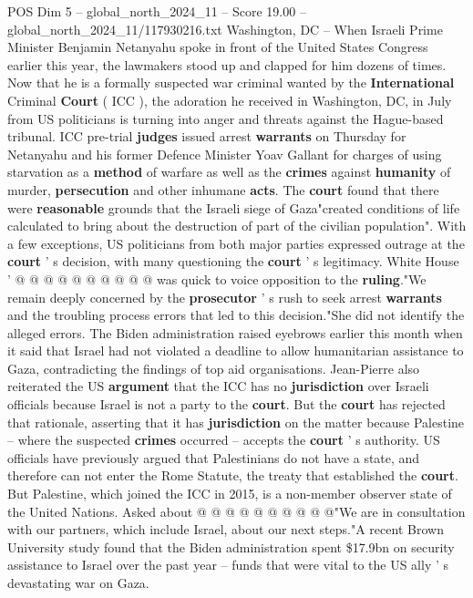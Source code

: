 \begin{textsample}{POS Dim 5 – global\_north\_2024\_11 – Score 19.00 – global\_north\_2024\_11/117930216.txt}  \label{ex:f5_pos_034}
Washington, DC -- When Israeli Prime Minister Benjamin Netanyahu spoke in front of the United States Congress earlier this year, the lawmakers stood up and clapped for him dozens of times.
Now that he is a formally suspected war criminal wanted by the \textbf{International} Criminal \textbf{Court} ( ICC ), the adoration he received in Washington, DC, in July from US politicians is turning into anger and threats against the Hague-based tribunal.
ICC pre-trial \textbf{judges} issued arrest \textbf{warrants} on Thursday for Netanyahu and his former Defence Minister Yoav Gallant for charges of using starvation as a \textbf{method} of warfare as well as the \textbf{crimes} against \textbf{humanity} of murder, \textbf{persecution} and other inhumane \textbf{acts}.
The \textbf{court} found that there were \textbf{reasonable} grounds that the Israeli siege of Gaza"created conditions of life calculated to bring about the destruction of part of the civilian population".
With a few exceptions, US politicians from both major parties expressed outrage at the \textbf{court} ' s decision, with many questioning the \textbf{court} ' s legitimacy.
White House ' @ @ @ @ @ @ @ @ @ @ was quick to voice opposition to the \textbf{ruling}."We remain deeply concerned by the \textbf{prosecutor} ' s rush to seek arrest \textbf{warrants} and the troubling process errors that led to this decision."She did not identify the alleged errors.
The Biden administration raised eyebrows earlier this month when it said that Israel had not violated a deadline to allow humanitarian assistance to Gaza, contradicting the findings of top aid organisations.
Jean-Pierre also reiterated the US \textbf{argument} that the ICC has no \textbf{jurisdiction} over Israeli officials because Israel is not a party to the \textbf{court}.
But the \textbf{court} has rejected that rationale, asserting that it has \textbf{jurisdiction} on the matter because Palestine -- where the suspected \textbf{crimes} occurred -- accepts the \textbf{court} ' s authority.
US officials have previously argued that Palestinians do not have a state, and therefore can not enter the Rome Statute, the treaty that established the \textbf{court}.
But Palestine, which joined the ICC in 2015, is a non-member observer state of the United Nations.
Asked about @ @ @ @ @ @ @ @ @ @"We are in consultation with our partners, which include Israel, about our next steps."A recent Brown University study found that the Biden administration spent \$17.9bn on security assistance to Israel over the past year -- funds that were vital to the US ally ' s devastating war on Gaza.

\end{textsample}

